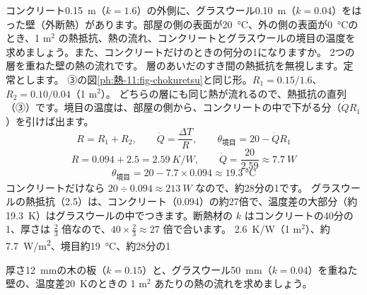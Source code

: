 \label{ph:熱-11:ex3}
\begin{phreidai}[断熱材の効きめ]
コンクリート\qty{0.15}{m}（$k=1.6$）の外側に、グラスウール\qty{0.10}{m}（$k=0.04$）をはった壁（外断熱）があります。部屋の側の表面が\qty{20}{\celsius}、外の側の表面が\qty{0}{\celsius}のとき、1 m$^2$ の熱抵抗、熱の流れ、コンクリートとグラスウールの境目の温度を求めましょう。また、コンクリートだけのときの何分の1になりますか。
\phbamen
2つの層を重ねた壁の熱の流れです。
\phmushi
層のあいだのすき間の熱抵抗を無視します。定常とします。
\phzu
③の図\ref{ph:熱-11:fig-chokuretsu}と同じ形。$R_1=0.15/1.6$、$R_2=0.10/0.04$（1 m$^2$）。
\phriyu
どちらの層にも同じ熱が流れるので、熱抵抗の直列（③）です。境目の温度は、部屋の側から、コンクリートの中で下がる分（$\dot QR_1$）を引けば出ます。
\phtateru
\[R=R_1+R_2,\qquad\dot Q=\frac{\Delta T}{R},\qquad\theta_{\text{境目}}=20-\dot QR_1\]
\phtoku
\[R=0.094+2.5=\qty{2.59}{K/W},\qquad\dot Q=\frac{20}{2.59}\approx\qty{7.7}{W}\]
\[\theta_{\text{境目}}=20-7.7\times0.094\approx\qty{19.3}{\celsius}\]
コンクリートだけなら $20\div0.094\approx\qty{213}{W}$ なので、約28分の1です。
\phtashikame
グラスウールの熱抵抗（2.5）は、コンクリート（0.094）の約27倍で、温度差の大部分（約\qty{19.3}{K}）はグラスウールの中でつきます。断熱材の $k$ はコンクリートの40分の1、厚さは $\tfrac{2}{3}$ 倍なので、$40\times\tfrac{2}{3}\approx27$ 倍で合います。
\kotae \qty{2.6}{K/W}（1 m$^2$）、約\qty{7.7}{W/m^2}、境目約\qty{19}{\celsius}、約28分の1
\end{phreidai}
\begin{jibun}
厚さ\qty{12}{mm}の木の板（$k=0.15$）と、グラスウール\qty{50}{mm}（$k=0.04$）を重ねた壁の、温度差\qty{20}{K}のときの 1 m$^2$ あたりの熱の流れを求めましょう。
\end{jibun}

